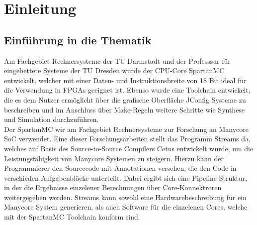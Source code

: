 \chapter{Einleitung}
\section{Einführung in die Thematik}
Am Fachgebiet Rechnersysteme der TU Darmstadt und der Professsur für eingebettete Systeme der TU Dresden wurde der CPU-Core
SpartanMC entwickelt, welcher mit einer Daten- und Instruktionsbreite von 18 Bit ideal für die Verwendung in FPGAs geeignet ist. %
Ebenso wurde eine Toolchain entwickelt, die es dem Nutzer ermöglicht über die grafische Oberfläche JConfig Systeme zu beschreiben und
im Anschluss über Make-Regeln weitere Schritte wie Synthese und Simulation durchzuführen.\\
Der SpartanMC wir am Fachgebiet Rechnersysteme zur Forschung an Manycore SoC verwendet. Eine dieser Forschungsarbeiten stellt das Programm \textmu\/Streams da,
welches auf Basis des Source-to-Source Compilers Cetus entwickelt wurde, um die Leistungsfähigkeit von Manycore Systemen zu steigern. %
Hierzu kann der Programmierer den Sourcecode mit Annotationen versehen, die den Code in verschieden Aufgabenblöcke unterteilt. Dabei ergibt sich
eine Pipeline-Struktur, in der die Ergebnisse einzelener Berechnungen über Core-Konnektroren weitergegeben werden.
\textmu\/Streams kann sowohl eine Hardwarebeschreibung für ein Manycore System generieren, als auch Software für die einzelenen Cores, 
welche mit der SpartanMC Toolchain konform sind.\\

